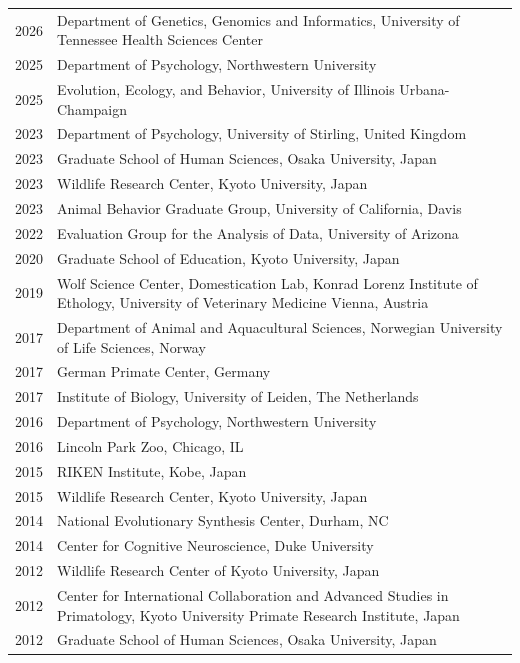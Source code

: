 \documentclass[11pt]{article}
\begin{document}
\begin{tabular}{p{3cm}p{12cm}}
  2026 & Department of Genetics, Genomics and Informatics, University of Tennessee Health Sciences Center \\
  2025 & Department of Psychology, Northwestern University \\
  2025 & Evolution, Ecology, and Behavior, University of Illinois Urbana-Champaign \\
  2023 & Department of Psychology, University of Stirling, United Kingdom \\
  2023 & Graduate School of Human Sciences, Osaka University, Japan \\
  2023 & Wildlife Research Center, Kyoto University, Japan \\
  2023 & Animal Behavior Graduate Group, University of California, Davis \\
  2022 & Evaluation Group for the Analysis of Data, University of Arizona \\
  2020 & Graduate School of Education, Kyoto University, Japan \\
  2019 & Wolf Science Center, Domestication Lab, Konrad Lorenz Institute
         of Ethology, University of Veterinary Medicine Vienna, Austria \\
  2017 & Department of Animal and Aquacultural Sciences, Norwegian University of Life Sciences, Norway \\
  2017 & German Primate Center, Germany \\
  2017 & Institute of Biology, University of Leiden, The Netherlands \\
  2016 & Department of Psychology, Northwestern University \\
  2016 & Lincoln Park Zoo, Chicago, IL \\
  2015 & RIKEN Institute, Kobe, Japan \\
  2015 & Wildlife Research Center, Kyoto University, Japan \\
  2014 & National Evolutionary Synthesis Center, Durham, NC \\
  2014 & Center for Cognitive Neuroscience, Duke University \\
  2012 & Wildlife Research Center of Kyoto University, Japan \\
  2012 & Center for International Collaboration and Advanced Studies in
         Primatology, Kyoto University Primate Research Institute, Japan \\
  2012 & Graduate School of Human Sciences, Osaka University, Japan \\

\end{tabular}
\end{document}
